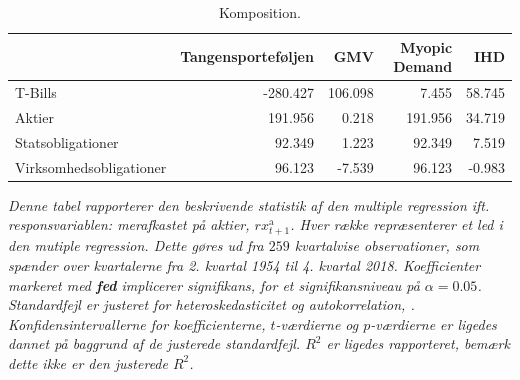 \documentclass[
  a4paper,
  oneside]{memoir}
\begin{document}
\begin{table}[H]

\caption{\label{tab:AL-KOMP}Komposition.}
\centering
\begin{threeparttable}
\begin{tabular}[t]{lrrrr}
\toprule
  & Tangensporteføljen & GMV & Myopic Demand & IHD\\
\midrule
\rowcolor{gray!6}  T-Bills & -280.427 & 106.098 & 7.455 & 58.745\\
Aktier & 191.956 & 0.218 & 191.956 & 34.719\\
\rowcolor{gray!6}  Statsobligationer & 92.349 & 1.223 & 92.349 & 7.519\\
Virksomhedsobligationer & 96.123 & -7.539 & 96.123 & -0.983\\
\bottomrule
\end{tabular}
\begin{tablenotes}
\item \textit{Denne tabel rapporterer den beskrivende statistik af den multiple regression ift. responsvariablen: merafkastet på aktier, $rx_{t+1}^{\text{a}}$. Hver række repræsenterer et led i den mutiple regression. Dette gøres ud fra $259$ kvartalvise observationer, som spænder over kvartalerne fra 2. kvartal 1954 til 4. kvartal 2018. Koefficienter markeret med \textbf{fed} implicerer signifikans, for et signifikansniveau på $\alpha=0.05$. Standardfejl er justeret for heteroskedasticitet og autokorrelation, \citep{Newey1987}. Konfidensintervallerne for koefficienterne, $t$-værdierne og $p$-værdierne er ligedes dannet på baggrund af de justerede standardfejl. $R^2$ er ligedes rapporteret, bemærk dette ikke er den justerede $R^2$.}
\end{tablenotes}
\end{threeparttable}
\end{table}
\end{document}
